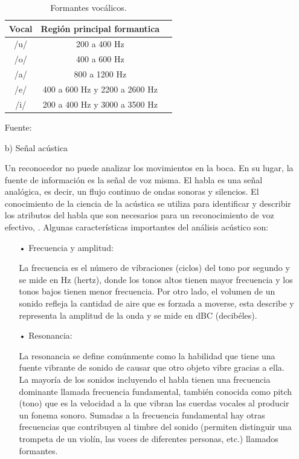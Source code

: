 \begin{enumerate}
\begin{center}
\begin{table}[h!]
\centering
\caption{\small{Formantes vocálicos.}}
\label{table:tabla2.2}
\vskip 0.2cm
\begin{tabular}{|c|c|c|}
\hline
{\small Vocal} & {\small Región principal formantica}\\ 
\hline 
{\small /u/} & {\small 200 a 400 Hz}\\ 
\hline 
{\small /o/} & {\small 400 a 600 Hz}\\ 
\hline 
{\small /a/} & {\small 800 a 1200 Hz}\\ 
\hline 
{\small /e/} & {\small 400 a 600 Hz y 2200 a 2600 Hz}\\ 
\hline 
{\small /i/} & {\small 200 a 400 Hz y 3000 a 3500 Hz}\\ 
\hline 
\end{tabular} 
\begin{center}
\vskip 0.2cm
{\small{Fuente: \cite{wikipedia1}}}
\end{center}
\end{table}
\end{center}

\item[b)]Señal acústica
\par
Un reconocedor no puede analizar los movimientos en la boca. En su lugar, la fuente de información es la señal de voz misma. El habla es una señal analógica, es decir, un flujo continuo de ondas sonoras y silencios. El conocimiento de la ciencia de la acústica se utiliza para identificar y describir los atributos del habla que son necesarios para un reconocimiento de voz efectivo, \cite{luis}.
\vskip 0.5cm
Algunas características importantes del análisis acústico son:
\begin{enumerate}
\item[•]Frecuencia y amplitud:
\par
La frecuencia es el número de vibraciones (ciclos) del tono por segundo y se mide en Hz (hertz), donde los tonos altos tienen mayor frecuencia y los tonos bajos tienen menor frecuencia. Por otro lado, el volumen de un sonido refleja la cantidad de aire que es forzada a moverse, esta describe y representa la amplitud de la onda y se mide en dBC (decibéles).

\item[•]Resonancia:
\par
La resonancia se define comúnmente como la habilidad que tiene una fuente vibrante de sonido de causar que otro objeto vibre gracias a ella. La mayoría de los sonidos incluyendo el habla tienen una frecuencia dominante llamada frecuencia fundamental, también conocida como pitch (tono) que es la velocidad a la que vibran las cuerdas vocales al producir un fonema sonoro. Sumadas a la frecuencia fundamental hay otras frecuencias que contribuyen al timbre del sonido (permiten distinguir una trompeta de un violín, las voces de diferentes personas, etc.) llamados formantes.


\end{enumerate}
\end{enumerate}
